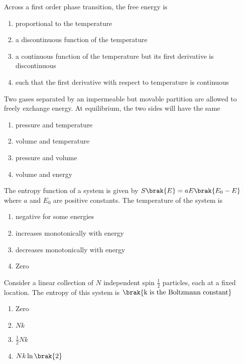 \item Across a first order phase transition, the free energy is
\hfill{}
\begin{enumerate}
\item proportional to the temperature
\item a discontinuous function of the temperature
\item a continuous function of the temperature but its first derivative is discontinuous
\item such that the first derivative with respect to temperature is continuous
\end{enumerate}

\item Two gases separated by an impermeable but movable partition are allowed to freely exchange energy. At equilibrium, the two sides will have the same
\hfill{}
\begin{enumerate}
\item pressure and temperature
\item volume and temperature
\item pressure and volume
\item volume and energy
\end{enumerate}

\item The entropy function of a system is given by $S\brak{E} = aE\brak{E_0 - E}$ where $a$ and $E_0$ are positive constants. The temperature of the system is
\hfill{}
\begin{enumerate}
\item negative for some energies 
\item increases monotonically with energy
\item decreases monotonically with energy
\item Zero
\end{enumerate}

\item Consider a linear collection of $N$ independent spin $\frac{1}{2}$ particles, each at a fixed location. The entropy of this system is $\brak{\text{k is the Boltzmann constant}}$
\hfill{}
\begin{enumerate}
\item Zero
\item $Nk$
\item $\frac{1}{2}Nk$
\item $Nk\ln\brak{2}$
\end{enumerate}

